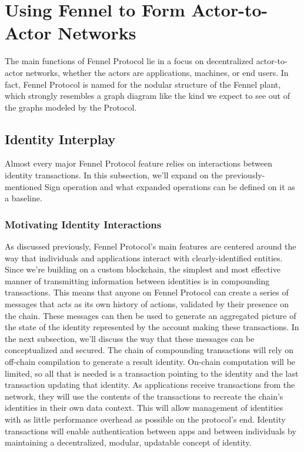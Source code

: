 \documentclass[]{article}
\begin{document}
\section{Using Fennel to Form Actor-to-Actor Networks}
\label{scrivauto:13}

The main functions of Fennel Protocol lie in a focus on decentralized actor-to-actor networks, whether the actors are applications, machines, or end users. In fact, Fennel Protocol is named for the nodular structure of the Fennel plant, which strongly resembles a graph diagram like the kind we expect to see out of the graphs modeled by the Protocol.

\subsection{Identity Interplay}
\label{scrivauto:14}

Almost every major Fennel Protocol feature relies on interactions between identity transactions. In this subsection, we'll expand on the previously-mentioned Sign operation and what expanded operations can be defined on it as a baseline.

\subsubsection{Motivating Identity Interactions}
\label{scrivauto:15}

As discussed previously, Fennel Protocol's main features are centered around the way that individuals and applications interact with clearly-identified entities. Since we're building on a custom blockchain, the simplest and most effective manner of transmitting information between identities is in compounding transactions. This means that anyone on Fennel Protocol can create a series of messages that acts as its own history of actions, validated by their presence on the chain. These messages can then be used to generate an aggregated picture of the state of the identity represented by the account making these transactions. In the next subsection, we'll discuss the way that these messages can be conceptualized and secured.
The chain of compounding transactions will rely on off-chain compilation to generate a result identity. On-chain computation will be limited, so all that is needed is a transaction pointing to the identity and the last transaction updating that identity. As applications receive transactions from the network, they will use the contents of the transactions to recreate the chain's identities in their own data context. This will allow management of identities with as little performance overhead as possible on the protocol's end.
Identity transactions will enable authentication between apps and between individuals by maintaining a decentralized, modular, updatable concept of identity.
\end{document}
